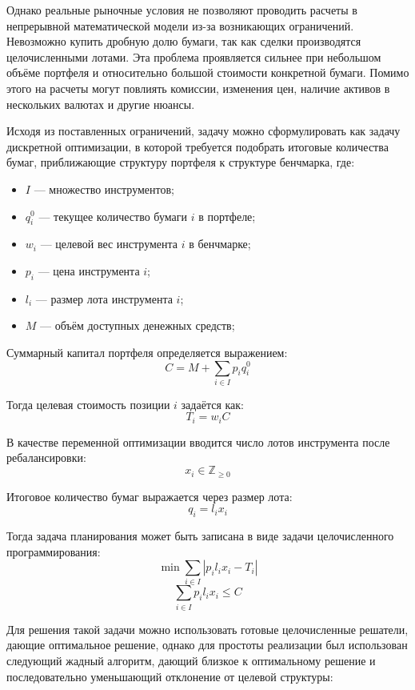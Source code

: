 \documentclass[14pt]{gost-7-32}
\begin{document}
Однако реальные рыночные условия не позволяют проводить расчеты в непрерывной математической модели из-за возникающих ограничений. Невозможно купить дробную долю бумаги, так как сделки производятся целочисленными лотами. Эта проблема проявляется сильнее при небольшом объёме портфеля и относительно большой стоимости конкретной бумаги. Помимо этого на расчеты могут повлиять комиссии, изменения цен, наличие активов в нескольких валютах и другие нюансы.

Исходя из поставленных ограничений, задачу можно сформулировать как задачу дискретной оптимизации, в которой требуется подобрать итоговые количества бумаг, приближающие структуру портфеля к структуре бенчмарка, где:

\begin{itemize}
  \item \(I\) --- множество инструментов;
  \item \(q_i^0\) --- текущее количество бумаги \(i\) в портфеле;
  \item \(w_i\) --- целевой вес инструмента \(i\) в бенчмарке;
  \item \(p_i\) --- цена инструмента \(i\);
  \item \(l_i\) --- размер лота инструмента \(i\);
  \item \(M\) --- объём доступных денежных средств;
\end{itemize}

Суммарный капитал портфеля определяется выражением:
\[
  C = M + \sum_{i \in I} p_i q_i^0
\]

Тогда целевая стоимость позиции \(i\) задаётся как:
\[
  T_i = w_i C
\]

В качестве переменной оптимизации вводится число лотов инструмента после ребалансировки:
\[
  x_i \in \mathbb{Z}_{\ge 0}
\]

Итоговое количество бумаг выражается через размер лота:
\[
  q_i = l_i x_i
\]

Тогда задача планирования может быть записана в виде задачи целочисленного программирования:
\[
  \min \sum_{i \in I} \left| p_i l_i x_i - T_i \right|
\]
\[
  \sum_{i \in I} p_i l_i x_i \le C
\]

Для решения такой задачи можно использовать готовые целочисленные решатели, дающие оптимальное решение, однако для простоты реализации был использован следующий жадный алгоритм, дающий близкое к оптимальному решение и последовательно уменьшающий отклонение от целевой структуры:
\end{document}
